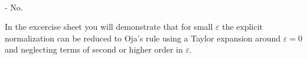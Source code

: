 \begin{frame}

\\

- No.\\

\pause

In the excercise sheet you will demonstrate that for small $\varepsilon$ the explicit normalization can be reduced to Oja's rule using a Taylor expansion around $\varepsilon = 0$ and neglecting terms of second or higher order in $\varepsilon$. 

\end{frame}
